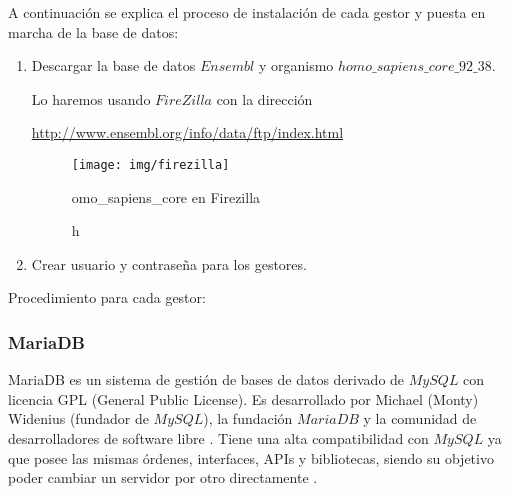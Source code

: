 \documentclass[12pt,a4paper]{article}
\begin{document}
A continuación se explica el proceso de instalación de cada gestor y puesta en marcha de la base de datos:

\begin{enumerate}

\item Descargar la base de datos $Ensembl$ y organismo $homo\_sapiens\_core\_92\_38.$

Lo haremos usando $FireZilla$  con la dirección   

\href{http://www.ensembl.org/info/data/ftp/index.html}{http://www.ensembl.org/info/data/ftp/index.html}
\begin{figure}[!h]
\centering
\texttt{[image: img/firezilla]}

\caption homo\_sapiens\_core en Firezilla
\label{fig1:fire} 
\end{figure}

\item Crear usuario y contraseña para los gestores.


\end{enumerate}

\newpage

Procedimiento para cada gestor:

\subsubsection{MariaDB} \label{pto211}

MariaDB es un sistema de gestión de bases de datos derivado de $MySQL$ con licencia GPL (General Public License). Es desarrollado por Michael (Monty) Widenius (fundador de $MySQL$), la fundación $MariaDB$ y la comunidad de desarrolladores de software libre \cite{cDB}. Tiene una alta compatibilidad con $MySQL$ ya que posee las mismas órdenes, interfaces, APIs y bibliotecas, siendo su objetivo poder cambiar un servidor por otro directamente \cite{cDB1}.
\end{document}
